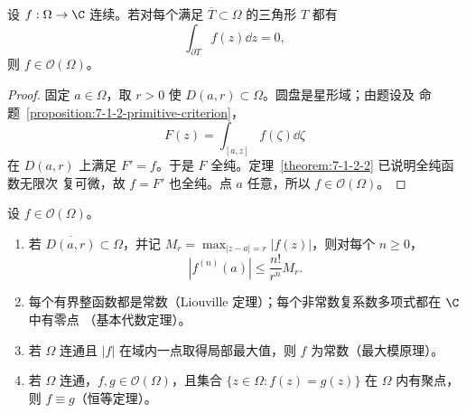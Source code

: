 \begin{theorem}[Morera 定理]\label{theorem:7-1-2-3}
设 $f:\Omega\to\C$ 连续。若对每个满足 $\overline T\subset\Omega$ 的三角形 $T$ 都有
\[
  \int_{\partial T}f(z)\dd z=0,
\]
则 $f\in\mathcal O(\Omega)$。
\end{theorem}

\begin{proof}
固定 $a\in\Omega$，取 $r>0$ 使 $D(a,r)\subset\Omega$。圆盘是星形域；由题设及
命题~\ref{proposition:7-1-2-primitive-criterion}，
\[
 F(z)=\int_{[a,z]}f(\zeta)\dd\zeta
\]
在 $D(a,r)$ 上满足 $F'=f$。于是 $F$ 全纯。定理~\ref{theorem:7-1-2-2} 已说明全纯函数无限次
复可微，故 $f=F'$ 也全纯。点 $a$ 任意，所以 $f\in\mathcal O(\Omega)$。
\end{proof}

\begin{corollary}[刚性推论]\label{corollary:7-1-2-4}
设 $f\in\mathcal O(\Omega)$。
\begin{enumerate}
  \item 若 $\overline{D(a,r)}\subset\Omega$，并记
        $M_r=\max_{|z-a|=r}|f(z)|$，则对每个 $n\ge0$，
        \[
          |f^{(n)}(a)|\le\frac{n!}{r^n}M_r.
          \tag{7.1.12}\label{eq:7-1-2-cauchy-estimate}
        \]
  \item 每个有界整函数都是常数（Liouville 定理）；每个非常数复系数多项式都在 $\C$ 中有零点
        （基本代数定理）。
  \item 若 $\Omega$ 连通且 $|f|$ 在域内一点取得局部最大值，则 $f$ 为常数（最大模原理）。
  \item 若 $\Omega$ 连通，$f,g\in\mathcal O(\Omega)$，且集合
        $\{z\in\Omega:f(z)=g(z)\}$ 在 $\Omega$ 内有聚点，则 $f\equiv g$（恒等定理）。
\end{enumerate}
\end{corollary}

